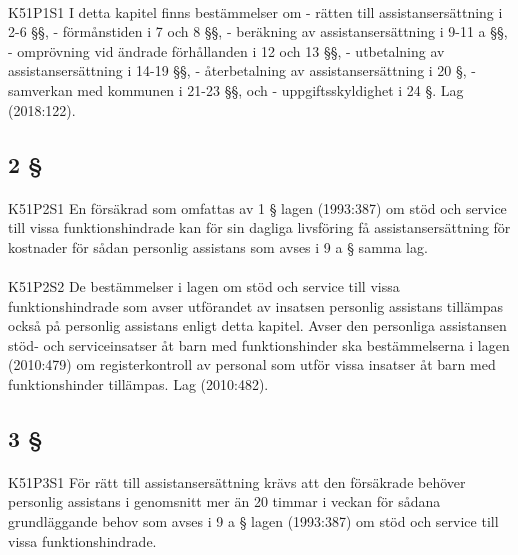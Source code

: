 \documentclass[a4paper,notitlepage,openany,10pt]{book}
\begin{document}
\paragraph*{}
{\tiny K51P1S1}
I detta kapitel finns bestämmelser om
\newline - rätten till assistansersättning i 2-6 §§,
\newline - förmånstiden i 7 och 8 §§,
\newline - beräkning av assistansersättning i 9-11 a §§,
\newline - omprövning vid ändrade förhållanden i 12 och 13 §§,
\newline - utbetalning av assistansersättning i 14-19 §§,
\newline - återbetalning av assistansersättning i 20 §,
\newline - samverkan med kommunen i 21-23 §§, och
\newline - uppgiftsskyldighet i 24 §.
Lag (2018:122).
\subsection*{2 §}
\paragraph*{}
{\tiny K51P2S1}
En försäkrad som omfattas av 1 § lagen (1993:387) om stöd och service till vissa funktionshindrade kan för sin dagliga livsföring få assistansersättning för kostnader för sådan personlig assistans som avses i 9 a § samma lag.
\paragraph*{}
{\tiny K51P2S2}
De bestämmelser i lagen om stöd och service till vissa funktionshindrade som avser utförandet av insatsen personlig assistans tillämpas också på personlig assistans enligt detta kapitel. Avser den personliga assistansen stöd- och serviceinsatser åt barn med funktionshinder ska bestämmelserna i lagen (2010:479) om registerkontroll av personal som utför vissa insatser åt barn med funktionshinder tillämpas.
Lag (2010:482).
\subsection*{3 §}
\paragraph*{}
{\tiny K51P3S1}
För rätt till assistansersättning krävs att den försäkrade behöver personlig assistans i genomsnitt mer än 20 timmar i veckan för sådana grundläggande behov som avses i 9 a § lagen (1993:387) om stöd och service till vissa funktionshindrade.
\end{document}
